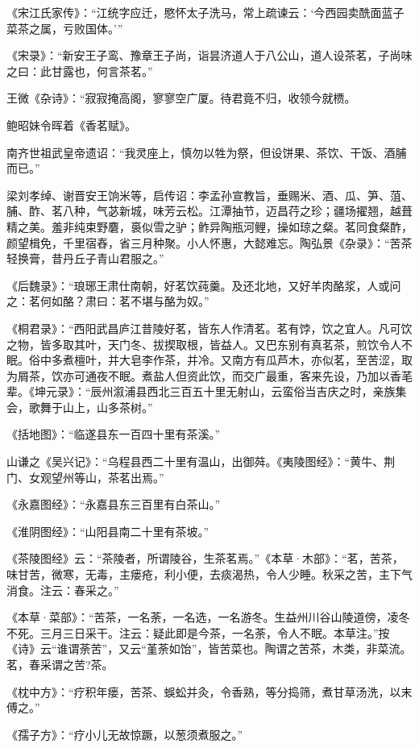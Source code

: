\documentclass[]{article}
\begin{document}
《宋江氏家传》：``江统字应迁，愍怀太子洗马，常上疏谏云：`今西园卖酰面蓝子菜茶之属，亏败国体。'''

《宋录》：``新安王子鸾、豫章王子尚，诣昙济道人于八公山，道人设茶茗，子尚味之曰：此甘露也，何言茶茗。''

王微《杂诗》：``寂寂掩高阁，寥寥空广厦。待君竟不归，收领今就槚。

鲍昭妹令晖着《香茗赋》。

南齐世祖武皇帝遗诏：``我灵座上，慎勿以牲为祭，但设饼果、茶饮、干饭、酒脯而已。''

梁刘孝绰、谢晋安王饷米等，启传诏：李孟孙宣教旨，垂赐米、酒、瓜、笋、菹、脯、酢、茗八种，气苾新城，味芳云松。江潭抽节，迈昌荇之珍；疆场擢翘，越葺精之美。羞非纯束野麏，裛似雪之驴；鲊异陶瓶河鲤，操如琼之粲。茗同食粲酢，颜望楫免，千里宿舂，省三月种聚。小人怀惠，大懿难忘。陶弘景《杂录》：``苦茶轻换膏，昔丹丘子青山君服之。''

《后魏录》：``琅琊王肃仕南朝，好茗饮莼羹。及还北地，又好羊肉酪浆，人或问之：茗何如酪？肃曰：茗不堪与酪为奴。''

《桐君录》：``西阳武昌庐江昔陵好茗，皆东人作清茗。茗有饽，饮之宜人。凡可饮之物，皆多取其叶，天门冬、拔揳取根，皆益人。又巴东别有真茗茶，煎饮令人不眠。俗中多煮檀叶，并大皂李作茶，并冷。又南方有瓜芦木，亦似茗，至苦涩，取为屑茶，饮亦可通夜不眠。煮盐人但资此饮，而交广最重，客来先设，乃加以香芼辈。《坤元录》：``辰州溆浦县西北三百五十里无射山，云蛮俗当吉庆之时，亲族集会，歌舞于山上，山多茶树。''

《括地图》：``临遂县东一百四十里有茶溪。''

山谦之《吴兴记》：``乌程县西二十里有温山，出御荈。《夷陵图经》：``黄牛、荆门、女观望州等山，茶茗出焉。''

《永嘉图经》：``永嘉县东三百里有白茶山。''

《淮阴图经》：``山阳县南二十里有茶坡。''

《茶陵图经》云：``茶陵者，所谓陵谷，生茶茗焉。''《本草·木部》：``茗，苦茶，味甘苦，微寒，无毒，主瘘疮，利小便，去痰渴热，令人少睡。秋采之苦，主下气消食。注云：春采之。''

《本草·菜部》：``苦茶，一名荼，一名选，一名游冬。生益州川谷山陵道傍，凌冬不死。三月三日采干。注云：疑此即是今茶，一名荼，令人不眠。本草注。''按《诗》云``谁谓荼苦''，又云``堇荼如饴''，皆苦菜也。陶谓之苦茶，木类，非菜流。茗，春采谓之苦?茶。

《枕中方》：``疗积年瘘，苦茶、蜈蚣并灸，令香熟，等分捣筛，煮甘草汤洗，以末傅之。''

《孺子方》：``疗小儿无故惊蹶，以葱须煮服之。''
\end{document}
